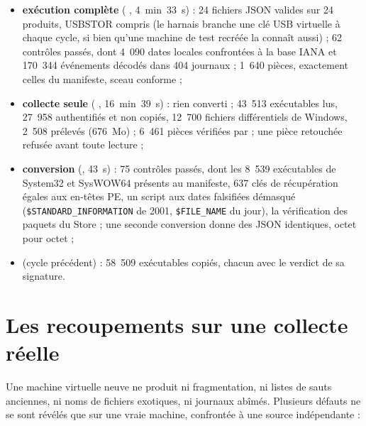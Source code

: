 \documentclass[11pt,a4paper,oneside]{report}
\begin{document}
\begin{itemize}
  \item \textbf{exécution complète} ( , 4~min~33~s) :
    24 fichiers JSON valides sur 24 produits, USBSTOR compris (le harnais
    branche une clé USB virtuelle à chaque cycle, si bien qu'une machine de
    test recréée la connaît aussi) ; 62 contrôles passés, dont 4~090 dates
    locales confrontées à la base IANA et 170~344 événements décodés dans
    404 journaux ; 1~640 pièces, exactement celles du manifeste, sceau conforme ;
  \item \textbf{collecte seule} (  ,
    16~min~39~s) : rien converti ; 43~513 exécutables lus, 27~958 authentifiés et non
    copiés, 12~700 fichiers différentiels de Windows, 2~508 prélevés (676~Mo) ;
    6~461 pièces vérifiées par  ; une pièce
    retouchée refusée avant toute lecture ;
  \item \textbf{conversion} (, 43~s) : 75 contrôles passés, dont
    les 8~539 exécutables de System32 et SysWOW64 présents au manifeste,
    637 clés de récupération égales aux en-têtes PE, un script aux dates
    falsifiées démasqué (\texttt{\$STANDARD\_\allowbreak INFORMATION} de 2001, \texttt{\$FILE\_NAME} du jour), la
    vérification des paquets du Store ; une seconde conversion donne des JSON
    identiques, octet pour octet ;
  \item \textbf{} (cycle précédent) : 58~509 exécutables
    copiés, chacun avec le verdict de sa signature.
\end{itemize}

\chapter{Les recoupements sur une collecte réelle}\label{ch:reel}

Une machine virtuelle neuve ne produit ni fragmentation, ni listes de sauts
anciennes, ni noms de fichiers exotiques, ni journaux abîmés. Plusieurs
défauts ne se sont révélés que sur une vraie machine, confrontée à une source
indépendante :
\end{document}
